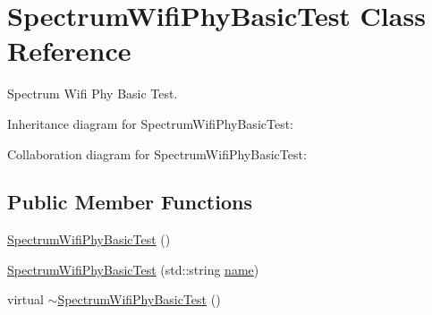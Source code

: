 \hypertarget{classSpectrumWifiPhyBasicTest}{}\section{Spectrum\+Wifi\+Phy\+Basic\+Test Class Reference}
\label{classSpectrumWifiPhyBasicTest}


Spectrum Wifi Phy Basic Test.  




Inheritance diagram for Spectrum\+Wifi\+Phy\+Basic\+Test\+:


Collaboration diagram for Spectrum\+Wifi\+Phy\+Basic\+Test\+:
\subsection*{Public Member Functions}
\begin{DoxyCompactItemize}
\item 
\hyperlink{classSpectrumWifiPhyBasicTest_a5ff31a8b606de0282b13f479f5bc5165}{Spectrum\+Wifi\+Phy\+Basic\+Test} ()
\item 
\hyperlink{classSpectrumWifiPhyBasicTest_a80082f0b985d0219cdc5692c41bb2114}{Spectrum\+Wifi\+Phy\+Basic\+Test} (std\+::string \hyperlink{generate__test__data__lte__spectrum__model_8m_ab74e6bf80237ddc4109968cedc58c151}{name})
\item 
virtual \hyperlink{classSpectrumWifiPhyBasicTest_ac1efea71bf41b64bce3a15add1bc4a4c}{$\sim$\+Spectrum\+Wifi\+Phy\+Basic\+Test} ()
\end{DoxyCompactItemize}
